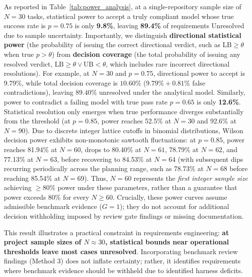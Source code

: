 \documentclass[runningheads]{llncs}
\begin{document}
As reported in Table~\ref{tab:power_analysis}, at a single-repository sample size of $N = 30$ tasks, statistical power to accept a truly compliant model whose true success rate is $p = 0.75$ is only \textbf{9.8\%}, leaving \textbf{89.4\%} of requirements Unresolved due to sample uncertainty. Importantly, we distinguish \textbf{directional statistical power} (the probability of issuing the correct directional verdict, such as $\text{LB} \ge \theta$ when true $p > \theta$) from \textbf{decision coverage} (the total probability of issuing any resolved verdict, $\text{LB} \ge \theta \lor \text{UB} < \theta$, which includes rare incorrect directional resolutions). For example, at $N = 30$ and $p = 0.75$, directional power to accept is 9.79\%, while total decision coverage is $10.60\%$ ($9.79\% + 0.81\%$ false contradictions), leaving $89.40\%$ unresolved under the analytical model. Similarly, power to contradict a failing model with true pass rate $p = 0.65$ is only \textbf{12.6\%}. Statistical resolution only emerges when true performance diverges substantially from the threshold (at $p = 0.85$, power reaches 52.5\% at $N = 30$ and 92.6\% at $N = 90$). Due to discrete integer lattice cutoffs in binomial distributions, Wilson decision power exhibits non-monotonic sawtooth fluctuations: at $p = 0.85$, power reaches 81.94\% at $N = 60$, drops to 80.40\% at $N = 61$, 78.79\% at $N = 62$, and 77.13\% at $N = 63$, before recovering to 84.53\% at $N = 64$ (with subsequent dips recurring periodically across the planning range, such as 78.73\% at $N = 68$ before reaching 85.54\% at $N = 69$). Thus, $N = 60$ represents the \emph{first integer sample size} achieving $\ge 80\%$ power under these parameters, rather than a guarantee that power exceeds 80\% for every $N \ge 60$. Crucially, these power curves assume admissible benchmark evidence ($G = 1$); they do not account for additional decision withholding imposed by review gate findings or missing documentation.

This result illustrates a practical constraint in requirements engineering: \textbf{at project sample sizes of $N \approx 30$, statistical bounds near operational thresholds leave most cases unresolved}. Incorporating benchmark review findings (Method 3) does not inflate certainty; rather, it identifies requirements where benchmark evidence should be withheld due to identified harness deficits.
\end{document}
